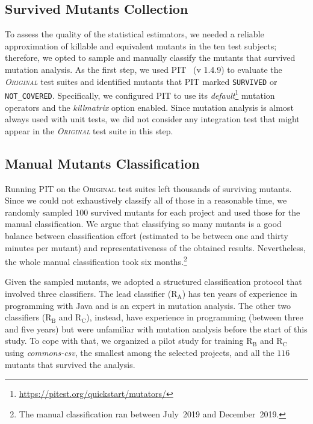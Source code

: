 \documentclass[sigconf,review,anonymous]{acmart}
\newcommand{\projectCount}{ten\xspace}
\newcommand{\rA}{\textsc{R$_\text{A}$}\xspace}
\newcommand{\rB}{\textsc{R$_\text{B}$}\xspace}
\newcommand{\rC}{\textsc{R$_\text{C}$}\xspace}
\newcommand{\original}{\textsc{Original}\xspace}
\newcommand{\PIT}{\textsc{PIT}\xspace}
\begin{document}
\subsection{Survived Mutants Collection}
\label{sec:mutant-generation}
To assess the quality of the statistical estimators, we needed a reliable approximation of
killable and equivalent mutants in the \projectCount test subjects; therefore, we opted to
sample and manually classify the mutants that survived mutation analysis.
%
As the first step, we used \PIT~\cite{pit} (v 1.4.9) to evaluate the \emph{\original} test suites
and identified mutants that \PIT marked \texttt{SURVIVED} or \texttt{NOT\_COVERED}.
%
Specifically, we configured \PIT to use its \emph{default}\footnote{\url{https://pitest.org/quickstart/mutators/}}
mutation operators and the \emph{killmatrix} option enabled.
%
Since mutation analysis is almost always used with unit
tests, we did not consider any integration test that might appear
in the \emph{\original} test suite in this step. %

\subsection{Manual Mutants Classification}
\label{sec:mutant-classification}
Running \PIT on the \original test suites left thousands of surviving mutants. 
Since we could not exhaustively classify all of those in a reasonable time, we randomly
sampled $100$ survived mutants for each project and used those 
for the manual classification.
%
We argue that classifying so many mutants is a good balance between classification
effort (estimated to be between one and thirty minutes per mutant) and representativeness 
of the obtained results. Nevertheless, the whole manual classification took six months.\footnote{The manual classification ran between July~2019 and December~2019.}

Given the sampled mutants, we adopted a structured classification protocol
that involved three classifiers. %
%
The lead classifier (\rA) has ten years of experience in programming with Java and is
an expert in mutation analysis. The other two classifiers (\rB and \rC), 
instead, have experience in programming (between three and five years) 
but were unfamiliar with mutation analysis before the start of this study.
%
To cope with that, we organized a pilot study for training \rB and \rC
using \emph{commons-csv}, the smallest among the selected projects, 
and all the $116$ mutants that survived the analysis.
\end{document}
